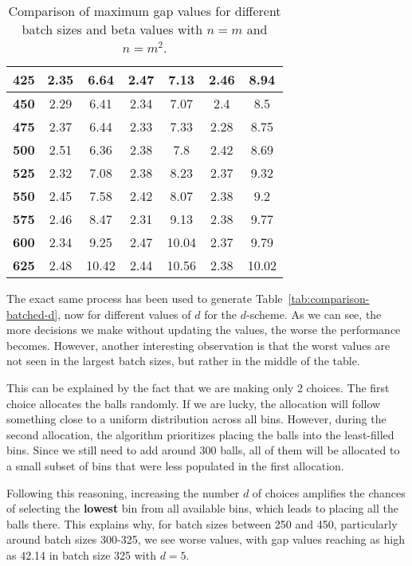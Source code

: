 \documentclass[a4paper, 11pt]{article}
\begin{document}
\begin{table}[H]
\begin{tabular}{|c||cc|cc|cc|}
        \textbf{425} & 2.35 & 6.64 & 2.47 & 7.13 & 2.46 & 8.94 \\ \hline
        \textbf{450} & 2.29 & 6.41 & 2.34 & 7.07 & 2.4 & 8.5 \\ \hline
        \textbf{475} & 2.37 & 6.44 & 2.33 & 7.33 & 2.28 & 8.75 \\ \hline
        \textbf{500} & 2.51 & 6.36 & 2.38 & 7.8 & 2.42 & 8.69 \\ \hline
        \textbf{525} & 2.32 & 7.08 & 2.38 & 8.23 & 2.37 & 9.32 \\ \hline
        \textbf{550} & 2.45 & 7.58 & 2.42 & 8.07 & 2.38 & 9.2 \\ \hline
        \textbf{575} & 2.46 & 8.47 & 2.31 & 9.13 & 2.38 & 9.77 \\ \hline
        \textbf{600} & 2.34 & 9.25 & 2.47 & 10.04 & 2.37 & 9.79 \\ \hline
        \textbf{625} & 2.48 & 10.42 & 2.44 & 10.56 & 2.38 & 10.02 \\ \hline
    \end{tabular}
    \caption{Comparison of maximum gap values for different batch sizes and beta values with $n = m$ and $n = m^2$.}
    \label{tab:comparison-batched-beta}
\end{table}

The exact same process has been used to generate Table~\ref{tab:comparison-batched-d}, now for different values of $d$ for the $d$-scheme. As we can see, the more decisions we make without updating the values, the worse the performance becomes. However, another interesting observation is that the worst values are not seen in the largest batch sizes, but rather in the middle of the table.

This can be explained by the fact that we are making only 2 choices. The first choice allocates the balls randomly. If we are lucky, the allocation will follow something close to a uniform distribution across all bins. However, during the second allocation, the algorithm prioritizes placing the balls into the least-filled bins. Since we still need to add around 300 balls, all of them will be allocated to a small subset of bins that were less populated in the first allocation.

Following this reasoning, increasing the number $d$ of choices amplifies the chances of selecting the \textbf{lowest} bin from all available bins, which leads to placing all the balls there. This explains why, for batch sizes between 250 and 450, particularly around batch sizes 300-325, we see worse values, with gap values reaching as high as 42.14 in batch size 325 with $d=5$.
\end{document}
